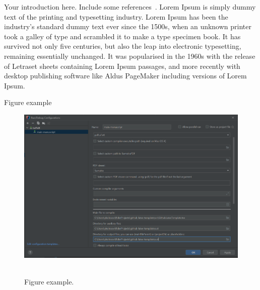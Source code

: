 Your introduction here.
Include some references~\cite{bayour2017truly,benkhettou2016conformable,caputo2009time,martins2009calculus,
    GithubSource_2022, Sloane_theencyclopedia}.
Lorem Ipsum is simply dummy text of the printing and typesetting industry.
Lorem Ipsum has been the industry's standard dummy text ever since the 1500s, when an unknown printer took a galley
of type and scrambled it to make a type specimen book.
It has survived not only five centuries, but also the leap into electronic typesetting, remaining essentially unchanged.
It was popularised in the 1960s with the release of Letraset sheets containing Lorem Ipsum passages, and more
recently with desktop publishing software like Aldus PageMaker including versions of Lorem Ipsum.

Figure example
\begin{figure}[H]
    \centering
    \includegraphics[width=1\textwidth]{../img/latex_configuration}
    ~\caption{Figure example.}\label{fig:figure}
\end{figure}